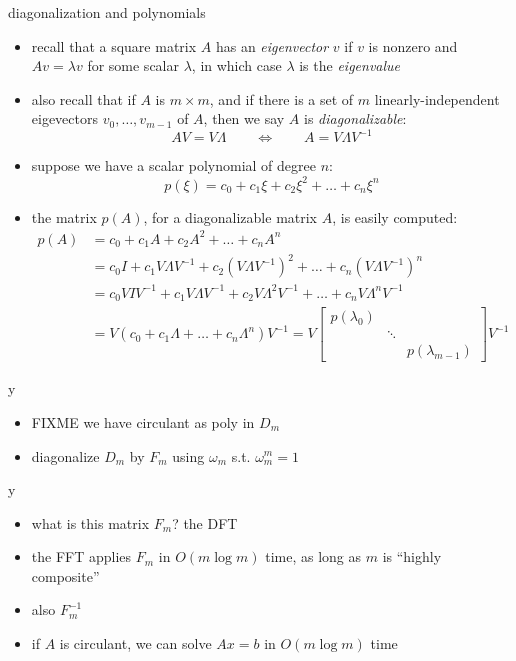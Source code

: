 \documentclass[10pt,
               svgnames,
               hyperref={colorlinks,citecolor=DeepPink4,linkcolor=FireBrick,urlcolor=Maroon},
               usepdftitle=false]{beamer}
\begin{document}
\begin{frame}{diagonalization and polynomials}

\begin{itemize}
\item recall that a square matrix $A$ has an \emph{eigenvector} $v$ if $v$ is nonzero and $Av=\lambda v$ for some scalar $\lambda$, in which case $\lambda$ is the \emph{eigenvalue}
\item also recall that if $A$ is $m\times m$, and if there is a set of $m$ linearly-independent eigevectors $v_0,\dots,v_{m-1}$ of $A$, then we say $A$ is \emph{diagonalizable}:
	$$AV = V \Lambda \qquad \iff \qquad A = V \Lambda V^{-1}$$
\item suppose we have a scalar polynomial of degree $n$:
	$$p(\xi) = c_0 + c_1 \xi + c_2 \xi^2 + \dots + c_n \xi^n$$
\item the matrix $p(A)$, for a diagonalizable matrix $A$, is easily computed:
\begin{align*}
p(A) &= c_0 + c_1 A + c_2 A^2 + \dots + c_n A^n \\
     &= c_0 I + c_1 V \Lambda V^{-1} + c_2 \left(V \Lambda V^{-1}\right)^2 + \dots + c_n \left(V \Lambda V^{-1}\right)^n \\
     &= c_0 V I V^{-1} + c_1 V \Lambda V^{-1} + c_2 V \Lambda^2 V^{-1} + \dots + c_n V \Lambda^n V^{-1} \\
     &= V \left(c_0 + c_1 \Lambda + \dots + c_n \Lambda^n\right) V^{-1} = V \begin{bmatrix} p(\lambda_0) & & \\ & \ddots & \\ & & p(\lambda_{m-1}) \end{bmatrix} V^{-1}
\end{align*}
\end{itemize}
\end{frame}


\begin{frame}{y}

\begin{itemize}
\item FIXME we have circulant as poly in $D_m$
\item diagonalize $D_m$ by $F_m$ using $\omega_m$ s.t. $\omega_m^m = 1$
\end{itemize}
\end{frame}


\begin{frame}{y}

\begin{itemize}
\item what is this matrix $F_m$? the DFT
\item the FFT applies $F_m$ in $O(m\log m)$ time, as long as $m$ is ``highly composite''
\item also $F_m^{-1}$
\item if $A$ is circulant, we can solve $Ax=b$ in $O(m\log m)$ time
\end{itemize}
\end{frame}
\end{document}
